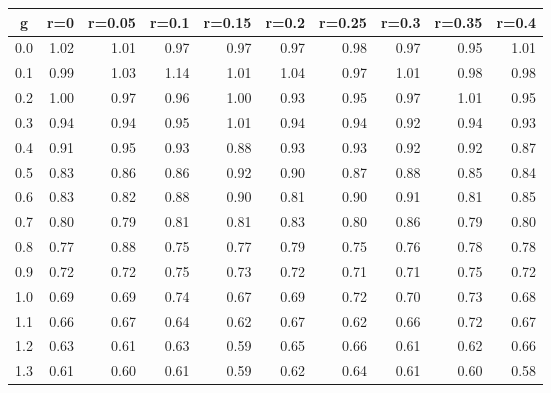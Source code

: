 %
\begin{table}[!tbp]
 \begin{center}
 \begin{tabular}{rrrrrrrrrr}\hline\hline
\multicolumn{1}{c}{g}&\multicolumn{1}{c}{r=0}&\multicolumn{1}{c}{r=0.05}&\multicolumn{1}{c}{r=0.1}&\multicolumn{1}{c}{r=0.15}&\multicolumn{1}{c}{r=0.2}&\multicolumn{1}{c}{r=0.25}&\multicolumn{1}{c}{r=0.3}&\multicolumn{1}{c}{r=0.35}&\multicolumn{1}{c}{r=0.4}\tabularnewline
\hline
0.0&1.02&1.01&0.97&0.97&0.97&0.98&0.97&0.95&1.01\tabularnewline
0.1&0.99&1.03&1.14&1.01&1.04&0.97&1.01&0.98&0.98\tabularnewline
0.2&1.00&0.97&0.96&1.00&0.93&0.95&0.97&1.01&0.95\tabularnewline
0.3&0.94&0.94&0.95&1.01&0.94&0.94&0.92&0.94&0.93\tabularnewline
0.4&0.91&0.95&0.93&0.88&0.93&0.93&0.92&0.92&0.87\tabularnewline
0.5&0.83&0.86&0.86&0.92&0.90&0.87&0.88&0.85&0.84\tabularnewline
0.6&0.83&0.82&0.88&0.90&0.81&0.90&0.91&0.81&0.85\tabularnewline
0.7&0.80&0.79&0.81&0.81&0.83&0.80&0.86&0.79&0.80\tabularnewline
0.8&0.77&0.88&0.75&0.77&0.79&0.75&0.76&0.78&0.78\tabularnewline
0.9&0.72&0.72&0.75&0.73&0.72&0.71&0.71&0.75&0.72\tabularnewline
1.0&0.69&0.69&0.74&0.67&0.69&0.72&0.70&0.73&0.68\tabularnewline
1.1&0.66&0.67&0.64&0.62&0.67&0.62&0.66&0.72&0.67\tabularnewline
1.2&0.63&0.61&0.63&0.59&0.65&0.66&0.61&0.62&0.66\tabularnewline
1.3&0.61&0.60&0.61&0.59&0.62&0.64&0.61&0.60&0.58\tabularnewline
\hline
\end{tabular}

\end{center}

\end{table}

